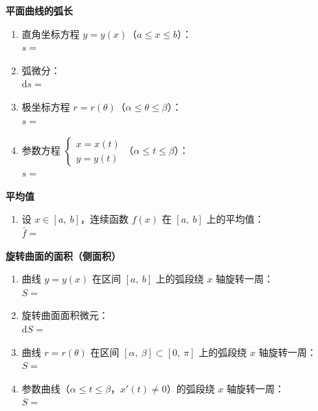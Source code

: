 \documentclass[a4paper,12pt]{article}
\begin{document}
    \hfill
    \begin{minipage}[t]{0.46\textwidth}

        \textbf{平面曲线的弧长}
        \begin{enumerate}[label=(\arabic*), leftmargin=2em, itemsep=1.2em]
            \item 直角坐标方程 $y=y(x)$（$a \le x \le b$）：\\[1em] $s = $\vspace{1em}
            \item 弧微分：\\[1em] $\mathrm{d}s = $\vspace{1em}
            \item 极坐标方程 $r=r(\theta)$（$\alpha \le \theta \le \beta$）：\\[1em] $s = $\vspace{1em}
            \item 参数方程 $\begin{cases} x=x(t) \\ y=y(t) \end{cases}$（$\alpha \le t \le \beta$）：\\[1em] $s = $\vspace{1em}
        \end{enumerate}

        \textbf{平均值}
        \begin{enumerate}[label=(\arabic*), leftmargin=2em, itemsep=1.2em]
            \item 设 $x \in [a,\ b]$，连续函数 $f(x)$ 在 $[a,\ b]$ 上的平均值：\\[1em] $\bar{f} = $\vspace{1em}
        \end{enumerate}

        \textbf{旋转曲面的面积（侧面积）}
        \begin{enumerate}[label=(\arabic*), leftmargin=2em, itemsep=1.2em]
            \item 曲线 $y=y(x)$ 在区间 $[a,\ b]$ 上的弧段绕 $x$ 轴旋转一周：\\[1em] $S = $\vspace{1em}
            \item 旋转曲面面积微元：\\[1em] $\mathrm{d}S = $\vspace{1em}
            \item 曲线 $r=r(\theta)$ 在区间 $[\alpha,\ \beta] \subset [0,\ \pi]$ 上的弧段绕 $x$ 轴旋转一周：\\[1em] $S = $\vspace{1em}
            \item 参数曲线（$\alpha \le t \le \beta$，$x'(t) \ne 0$）的弧段绕 $x$ 轴旋转一周：\\[1em] $S = $\vspace{1em}
        \end{enumerate}
    \end{minipage}
    \hfill
\end{document}
